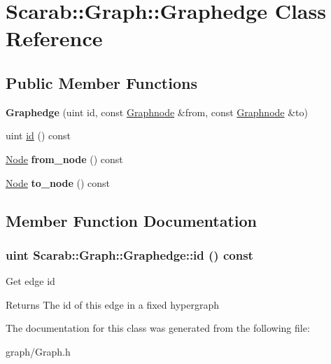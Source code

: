 \hypertarget{classScarab_1_1Graph_1_1Graphedge}{
\section{Scarab::Graph::Graphedge Class Reference}
\label{classScarab_1_1Graph_1_1Graphedge}
}
\subsection*{Public Member Functions}
\begin{DoxyCompactItemize}
\item 
\hypertarget{classScarab_1_1Graph_1_1Graphedge_aea165d2e0b46a46180f5e684df52abdf}{
{\bfseries Graphedge} (uint id, const \hyperlink{classScarab_1_1Graph_1_1Graphnode}{Graphnode} \&from, const \hyperlink{classScarab_1_1Graph_1_1Graphnode}{Graphnode} \&to)}
\label{classScarab_1_1Graph_1_1Graphedge_aea165d2e0b46a46180f5e684df52abdf}

\item 
uint \hyperlink{classScarab_1_1Graph_1_1Graphedge_af4e2b922eb0db014aa6af45ef911e47c}{id} () const 
\item 
\hypertarget{classScarab_1_1Graph_1_1Graphedge_a10760ab9034b358f9bd4aa28c44117d5}{
\hyperlink{classScarab_1_1Graph_1_1Graphnode}{Node} {\bfseries from\_\-node} () const }
\label{classScarab_1_1Graph_1_1Graphedge_a10760ab9034b358f9bd4aa28c44117d5}

\item 
\hypertarget{classScarab_1_1Graph_1_1Graphedge_ae5b1fccfa8a11847b8be2a27690243f0}{
\hyperlink{classScarab_1_1Graph_1_1Graphnode}{Node} {\bfseries to\_\-node} () const }
\label{classScarab_1_1Graph_1_1Graphedge_ae5b1fccfa8a11847b8be2a27690243f0}

\end{DoxyCompactItemize}


\subsection{Member Function Documentation}
\hypertarget{classScarab_1_1Graph_1_1Graphedge_af4e2b922eb0db014aa6af45ef911e47c}{
\subsubsection[{id}]{\setlength{\rightskip}{0pt plus 5cm}uint Scarab::Graph::Graphedge::id () const}}
\label{classScarab_1_1Graph_1_1Graphedge_af4e2b922eb0db014aa6af45ef911e47c}
Get edge id

\begin{DoxyReturn}{Returns}
The id of this edge in a fixed hypergraph 
\end{DoxyReturn}


The documentation for this class was generated from the following file:\begin{DoxyCompactItemize}
\item 
graph/Graph.h\end{DoxyCompactItemize}
